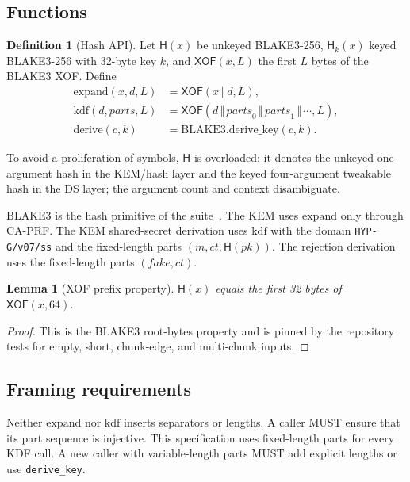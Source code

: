\documentclass[11pt,a4paper]{article}
\theoremstyle{plain}
\newtheorem{lemma}[theorem]{Lemma}
\theoremstyle{definition}
\newtheorem{definition}[theorem]{Definition}
\theoremstyle{remark}
\newcommand{\concat}{\,\Vert\,}
\newcommand{\Hash}{\mathsf{H}}
\newcommand{\XOF}{\mathsf{XOF}}
\begin{document}
\subsection{Functions}

\begin{definition}[Hash API]
Let $\Hash(x)$ be unkeyed BLAKE3-256, $\Hash_k(x)$ keyed BLAKE3-256
with 32-byte key $k$, and $\XOF(x,L)$ the first $L$ bytes of the
BLAKE3 XOF.  Define
\[
\begin{aligned}
 \mathrm{expand}(x,d,L) &= \XOF(x\concat d,L),\\
 \mathrm{kdf}(d,\mathit{parts},L) &=
   \XOF(d\concat\mathit{parts}_0\concat\mathit{parts}_1\concat\cdots,L),\\
 \mathrm{derive}(c,k) &= \mathrm{BLAKE3.derive\_key}(c,k).
\end{aligned}
\]
\end{definition}

To avoid a proliferation of symbols, $\Hash$ is overloaded: it denotes
the unkeyed one-argument hash in the KEM/hash layer and the keyed
four-argument tweakable hash in the DS layer; the argument count and
context disambiguate.

BLAKE3 is the hash primitive of the suite~\cite{blake3}.  The KEM uses
$\mathrm{expand}$ only through CA-PRF.  The KEM shared-secret derivation
uses $\mathrm{kdf}$ with the domain
\texttt{HYP-G/v07/ss} and the fixed-length parts $(m,ct,\Hash(pk))$.
The rejection derivation uses the fixed-length parts
$(\mathit{fake},ct)$.

\begin{lemma}[XOF prefix property]
\label{lem:xof-prefix}
$\Hash(x)$ equals the first 32 bytes of $\XOF(x,64)$.
\end{lemma}

\begin{proof}
This is the BLAKE3 root-bytes property and is pinned by the repository
tests for empty, short, chunk-edge, and multi-chunk inputs.
\end{proof}

\subsection{Framing requirements}

Neither $\mathrm{expand}$ nor $\mathrm{kdf}$ inserts separators or
lengths.  A caller MUST ensure that its part sequence is injective.
This specification uses fixed-length parts for every KDF call.  A new
caller with variable-length parts MUST add explicit lengths or use
\texttt{derive\_key}.
\end{document}
